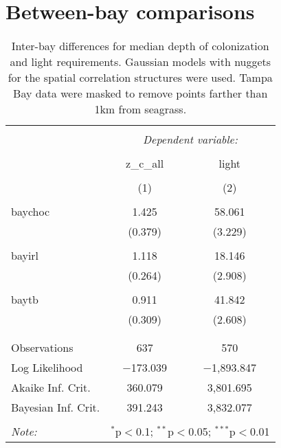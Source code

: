\documentclass[letterpaper,12pt]{article}\usepackage[]{graphicx}\usepackage[]{color}
\begin{document}
\section{Between-bay comparisons}    




\begin{table}[!htbp] \centering 
  \caption{Inter-bay differences for median depth of colonization and light requirements.  Gaussian models with nuggets for the spatial correlation structures were used.  Tampa Bay data were masked to remove points farther than 1km from seagrass.} 
  \label{} 
\begin{tabular}{@{\extracolsep{5pt}}lcc} 
\\[-1.8ex]\hline 
\hline \\[-1.8ex] 
 & \multicolumn{2}{c}{\textit{Dependent variable:}} \\ 
\cline{2-3} 
\\[-1.8ex] & z\_c\_all & light \\ 
\\[-1.8ex] & (1) & (2)\\ 
\hline \\[-1.8ex] 
 baychoc & 1.425 & 58.061 \\ 
  & (0.379) & (3.229) \\ 
  & & \\ 
 bayirl & 1.118 & 18.146 \\ 
  & (0.264) & (2.908) \\ 
  & & \\ 
 baytb & 0.911 & 41.842 \\ 
  & (0.309) & (2.608) \\ 
  & & \\ 
\hline \\[-1.8ex] 
Observations & 637 & 570 \\ 
Log Likelihood & $-$173.039 & $-$1,893.847 \\ 
Akaike Inf. Crit. & 360.079 & 3,801.695 \\ 
Bayesian Inf. Crit. & 391.243 & 3,832.077 \\ 
\hline 
\hline \\[-1.8ex] 
\textit{Note:}  & \multicolumn{2}{r}{$^{*}$p$<$0.1; $^{**}$p$<$0.05; $^{***}$p$<$0.01} \\ 
\end{tabular} 
\end{table} 
\end{document}
